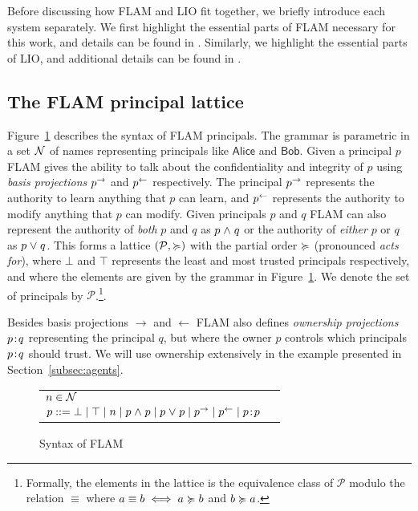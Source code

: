 Before discussing how FLAM and LIO fit together, we briefly introduce each system separately. We first highlight the essential parts of FLAM necessary for this work, and details can be found in \cite{Arden:2015:FA:2859845.2859998}. Similarly, we highlight the essential parts of LIO, and additional details can be found in \cite{SRMMlio}.

\subsection{The FLAM principal lattice}
Figure~\ref{fig:flam-syntax} describes the syntax of FLAM principals. The grammar is parametric in a set $\mathcal{N}$ of names representing principals like $\mathsf{Alice}$ and $\mathsf{Bob}$. Given a principal $p$ FLAM gives the ability to talk about the confidentiality and integrity of $p$ using \emph{basis projections} $p^{\rightarrow}$ and $p^{\leftarrow}$ respectively. The principal $p^{\rightarrow}$ represents the authority to learn anything that $p$ can learn, and $p^{\leftarrow}$ represents the authority to modify anything that $p$ can modify. Given principals $p$ and $q$ FLAM can also represent the authority of \emph{both} $p$ and $q$ as $p \mathrel{\land} q$ or the authority of \emph{either} $p$ or $q$ as $p \mathrel{\lor} q$. This forms a lattice $(\mathcal{P}, \succcurlyeq)$ with the partial order $\succcurlyeq$ (pronounced \emph{acts for}), where $\bot$ and $\top$ represents the least and most trusted principals respectively, and where the elements are given by the grammar in Figure~\ref{fig:flam-syntax}. We denote the set of principals by $\mathcal{P}$.\footnote{Formally, the elements in the lattice is the equivalence class of $\mathcal{P}$ modulo the relation $\equiv$ where $a \equiv b \iff a \succcurlyeq b$ and $b \succcurlyeq a$.}.

Besides basis projections $\rightarrow$ and $\leftarrow$ FLAM also defines \emph{ownership projections} $p\!:\!q$ representing the principal $q$, but where the owner $p$ controls which principals $p\!:\!q$ should trust. We will use ownership extensively in the example presented in Section~\ref{subsec:agents}.

\begin{figure}
    \centering
    \begin{tabular}{ll}
    $n \in \mathcal{N}$ \\
    $p ::= \bot \mid \top \mid n \mid p \mathrel{\land} p \mid p \mathrel{\lor} p \mid p^{\rightarrow} \mid p^{\leftarrow} \mid p\!:\!p$
    \end{tabular}
    \caption{Syntax of FLAM}
    \label{fig:flam-syntax}
\end{figure}


